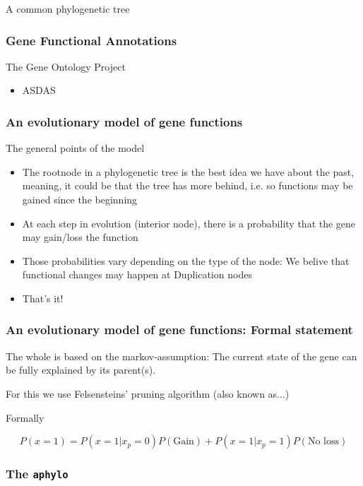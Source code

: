 \documentclass{beamer}
\newcommand{\aphylopkg}[0]{\texttt{aphylo}}
\begin{document}
\begin{frame}
A common phylogenetic tree
\end{frame}

\begin{frame}
\frametitle{Gene Functional Annotations}

The Gene Ontology Project

\begin{itemize}
\item ASDAS
\end{itemize}

\end{frame}


\begin{frame}
\frametitle{An evolutionary model of gene functions}

The general points of the model
\begin{itemize}
\item The rootnode in a phylogenetic tree is the best idea we have about the past, meaning,
it could be that the tree has more behind, i.e. so functions may be gained since the beginning
\item At each step in evolution (interior node), there is a probability that the gene may
gain/loss the function
\item Those probabilities vary depending on the type of the node: We belive that functional
changes may happen at Duplication nodes
\item That's it!
\end{itemize}
\end{frame}

\begin{frame}
\frametitle{An evolutionary model of gene functions: Formal statement}

The whole is based on the markov-assumption: The current state of the gene can be
fully explained by its parent(s).

For this we use Felsensteins' pruning algorithm (also known as...)

Formally

$$
P(x = 1) = P(x = 1| x_p = 0)P(\mbox{Gain}) + P(x = 1| x_p = 1)P(\mbox{No loss})
$$

\end{frame}

\begin{frame}
\frametitle{The \aphylopkg{}}
\end{frame}


\end{document}
